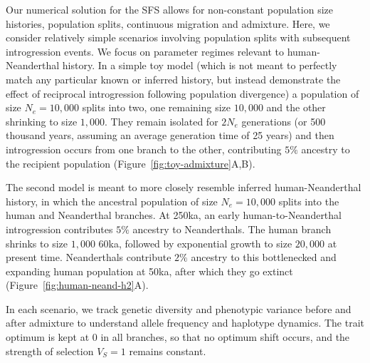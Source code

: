 \documentclass{article}
\begin{document}
Our numerical solution for the SFS allows for non-constant population size
histories, population splits, continuous migration and admixture. Here, we
consider relatively simple scenarios involving population splits with
subsequent introgression events. We focus on parameter regimes relevant to
human-Neanderthal history. In a simple toy model (which is not meant to
perfectly match any particular known or inferred history, but instead
demonstrate the effect of reciprocal introgression following population
divergence) a population of size $N_e=10{,}000$ splits into two, one remaining
size $10{,}000$ and the other shrinking to size $1{,}000$. They remain isolated
for $2N_e$ generations (or 500 thousand years, assuming an average generation
time of 25 years) and then introgression occurs from one branch to the other,
contributing $5\%$ ancestry to the recipient population
(Figure~\ref{fig:toy-admixture}A,B).

The second model is meant to more closely resemble inferred human-Neanderthal
history, in which the ancestral population of size $N_e=10{,}000$ splits into the
human and Neanderthal branches. At 250ka, an early human-to-Neanderthal
introgression contributes $5\%$ ancestry to Neanderthals. The human branch
shrinks to size $1{,}000$ 60ka, followed by exponential growth to size $20,000$
at present time. Neanderthals contribute $2\%$ ancestry to this bottlenecked
and expanding human population at 50ka, after which they go extinct
(Figure~\ref{fig:human-neand-h2}A).

In each scenario, we track genetic diversity and phenotypic variance before and
after admixture to understand allele frequency and haplotype dynamics. The
trait optimum is kept at $0$ in all branches, so that no optimum shift occurs,
and the strength of selection $V_S=1$ remains constant.
\end{document}
